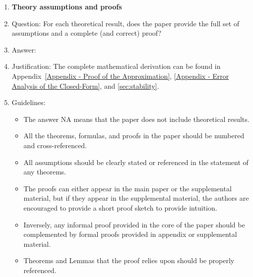 \documentclass{article}
\begin{document}
\begin{enumerate}
\item {\bf Theory assumptions and proofs}
    \item[] Question: For each theoretical result, does the paper provide the full set of assumptions and a complete (and correct) proof?
    \item[] Answer: \answerYes{} %
    \item[] Justification: The complete mathematical derivation can be found in Appendix~\ref{Appendix - Proof of the Approximation}, \ref{Appendix - Error Analysis of the Closed-Form}, and \ref{sec:stability}.
    \item[] Guidelines:
    \begin{itemize}
        \item The answer NA means that the paper does not include theoretical results. 
        \item All the theorems, formulas, and proofs in the paper should be numbered and cross-referenced.
        \item All assumptions should be clearly stated or referenced in the statement of any theorems.
        \item The proofs can either appear in the main paper or the supplemental material, but if they appear in the supplemental material, the authors are encouraged to provide a short proof sketch to provide intuition. 
        \item Inversely, any informal proof provided in the core of the paper should be complemented by formal proofs provided in appendix or supplemental material.
        \item Theorems and Lemmas that the proof relies upon should be properly referenced. 
    \end{itemize}


\end{enumerate}
\end{document}
